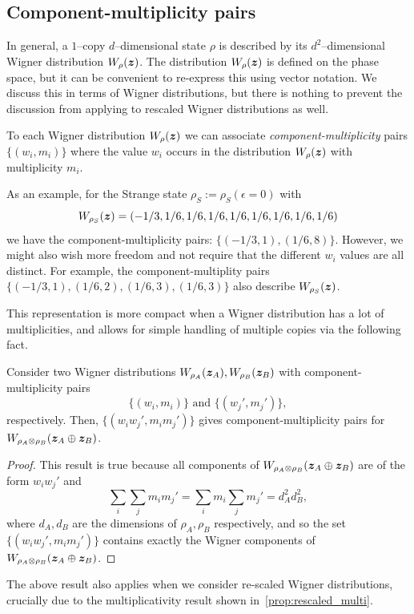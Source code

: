 \documentclass[pra,
aps,
twocolumn,
superscriptaddress,
groupedaddress,
nofootinbib,
reprint
]{revtex4-1}
\begin{document}
\subsection{Component-multiplicity pairs}
\label{app:cmpairs}

In general, a $1$--copy $d$--dimensional state $\rho$ is described by its $d^2$--dimensional Wigner distribution $\W{\rho}(\bmz)$. 
The distribution $\W{\rho}(\bmz)$ is defined on the phase space, but it can be convenient to re-express this using vector notation.
We discuss this in terms of Wigner distributions, but there is nothing to prevent the discussion from applying to rescaled Wigner distributions as well.

To each Wigner distribution $W_\rho(\bm{z})$ we can associate \emph{component-multiplicity} pairs $\{(w_i, m_i)\}$ where the value $w_i$ occurs in the distribution $W_\rho(\bm{z})$ with multiplicity $m_i$.

As an example, for the Strange state $\rho_S := \rho_S(\epsilon=0)$ with
\begin{equation}
W_{\rho_S}(\bm{z}) = (-1/3, 1/6,  1/6,  1/6,  1/6,  1/6,  1/6,  1/6,  1/6)
\end{equation}
we have the component-multiplicity pairs: $\{( -1/3, 1), ( 1/6, 8)\}$. However, we might also wish more freedom and not require that the different $w_i$ values are all distinct. For example, the component-multiplity pairs $\{(-1/3, 1), (1/6, 2), (1/6, 3), (1/6, 3)\}$ also describe $W_{\rho_S}(\bm{z})$.

This representation is more compact when a Wigner distribution has a lot of multiplicities, and allows for simple handling of multiple copies via the following fact.
\begin{lemma}
Consider two Wigner distributions $\W{\rho_A}(\bmz_A), \W{\rho_B}(\bmz_B)$ with component-multiplicity pairs 
\begin{equation}
	\{(w_i, m_i)\} \text{ and } \{(w_j', m_j')\},
\end{equation}
respectively. Then, $\{(w_i w_j', m_i m_j')\}$ gives component-multiplicity pairs for $\W{\rho_A \otimes \rho_B}(\bmz_A \oplus \bmz_B)$.
\end{lemma}
\begin{proof}
	This result is true because all components of $\W{\rho_A \otimes \rho_B}(\bmz_A \oplus \bmz_B)$ are of the form $w_i w_j'$ and 
\begin{equation*}
	\sum_{i}\sum_{j} m_i m_j' = \sum_{i} m_i \sum_{j} m_j' = d_A^2 d_B^2,
\end{equation*}
where $d_A, d_B$ are the dimensions of $\rho_A, \rho_B$ respectively, and
so the set $\{(w_i w_j', m_i m_j')\}$ contains exactly the Wigner components of $\W{\rho_A \otimes \rho_B}(\bmz_A \oplus \bmz_B)$.
\end{proof}
The above result also applies when we consider re-scaled Wigner distributions, crucially due to the multiplicativity result shown in~\cref{prop:rescaled_multi}.
\end{document}
